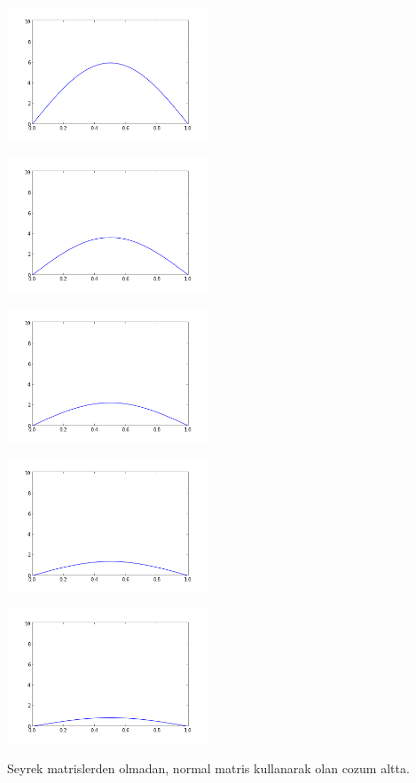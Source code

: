 \documentclass[12pt,fleqn]{article}\usepackage{../common}
\begin{document}
\includegraphics[height=4cm]{heat-20.png}

\includegraphics[height=4cm]{heat-40.png}

\includegraphics[height=4cm]{heat-60.png}

\includegraphics[height=4cm]{heat-80.png}

\includegraphics[height=4cm]{heat-100.png}

Seyrek matrislerden olmadan, normal matris kullanarak olan cozum altta.
\end{document}
